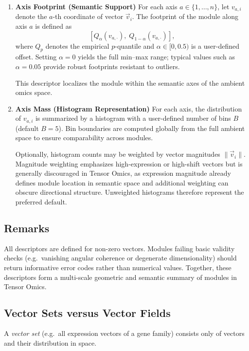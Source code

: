 \documentclass{article}
\begin{document}
\begin{enumerate}
\item \textbf{Axis Footprint (Semantic Support)}  
For each axis \(a \in \{1,\ldots,n\}\), let \(v_{a,i}\) denote the \(a\)-th
coordinate of vector \(\vec{v}_i\).
The footprint of the module along axis \(a\) is defined as
\[
\left[
Q_{\alpha}(v_{a,\cdot}),
\;
Q_{1-\alpha}(v_{a,\cdot})
\right],
\]
where \(Q_p\) denotes the empirical \(p\)-quantile and
\(\alpha \in [0,0.5)\) is a user-defined offset.
Setting \(\alpha = 0\) yields the full min--max range; typical values such as
\(\alpha = 0.05\) provide robust footprints resistant to outliers.

This descriptor localizes the module within the semantic axes of the ambient
omics space.

\item \textbf{Axis Mass (Histogram Representation)}  
For each axis, the distribution of \(v_{a,i}\) is summarized by a histogram with
a user-defined number of bins \(B\) (default \(B=5\)).
Bin boundaries are computed globally from the full ambient space to ensure
comparability across modules.

Optionally, histogram counts may be weighted by vector magnitudes
\(\|\vec{v}_i\|\).
Magnitude weighting emphasizes high-expression or high-shift vectors but is
generally discouraged in Tensor Omics, as expression magnitude already defines
module location in semantic space and additional weighting can obscure
directional structure.
Unweighted histograms therefore represent the preferred default.

\end{enumerate}

\subsection*{Remarks}

All descriptors are defined for non-zero vectors.
Modules failing basic validity checks (e.g.\ vanishing angular coherence or
degenerate dimensionality) should return informative error codes rather than
numerical values.
Together, these descriptors form a multi-scale geometric and semantic summary of
modules in Tensor Omics.

\subsection{Vector Sets versus Vector Fields}

A \textit{vector set} (e.g.\ all expression vectors of a gene family) consists 
only of vectors and their distribution in space.  
\end{document}
